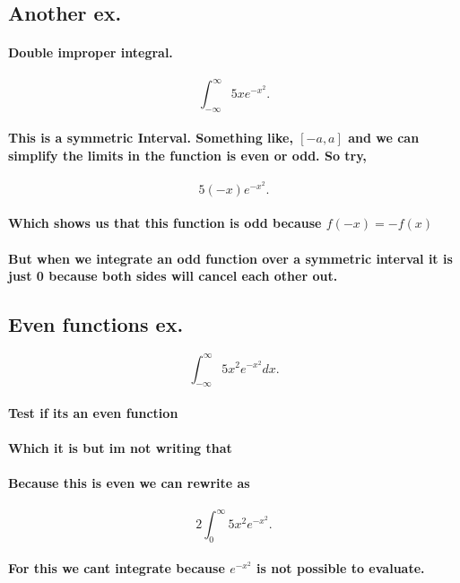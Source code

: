 \documentclass[a4paper]{article}
\begin{document}
\subsection{Another ex.}%
\label{sub:Another ex.}
\paragraph{Double improper integral.}
\[
\int_{-\infty}^{\infty} 5xe^{-x^2}
.\] 
\paragraph{This is a symmetric Interval. Something like, $\left[-a,a\right]$ and we can simplify the limits in the function is even or odd. So try,}
\[
5(-x)e^{-x^2}
.\] 
\paragraph{Which shows us that this function is odd because $f(-x) =-f(x)$}
\paragraph{But when we integrate an odd function over a symmetric interval it is just 0 because both sides will cancel each other out. }
\subsection{Even functions ex.}%
\label{sub:Even functions ex.}
\[
\int_{-\infty}^{\infty} 5x^2e^{-x^2}dx
.\] 
\paragraph{Test if its an even function}%
\label{par:Test if its an even function}
\paragraph{Which it is but im not writing that}

\paragraph{Because this is even we can rewrite as}
\[
  2 \int_{0}^{\infty} 5x^2e^{-x^2}
.\]
\paragraph{For this we cant integrate because $e^{-x^2}$ is not possible to evaluate. }
\end{document}
